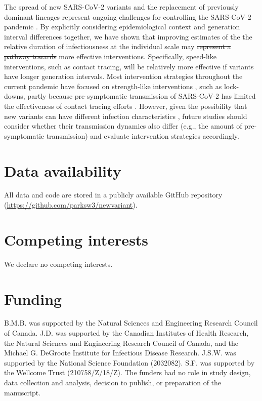 \documentclass[12pt]{article}
\providecommand{\DIFaddtex}[1]{{\protect\color{blue}\uwave{#1}}} %
\providecommand{\DIFdeltex}[1]{{\protect\color{red}\sout{#1}}}                      %
\providecommand{\DIFaddbegin}{} %
\providecommand{\DIFaddend}{} %
\providecommand{\DIFdelbegin}{} %
\providecommand{\DIFdelend}{} %
\providecommand{\DIFadd}[1]{\texorpdfstring{\DIFaddtex{#1}}{#1}} %
\providecommand{\DIFdel}[1]{\texorpdfstring{\DIFdeltex{#1}}{}} %
\newcommand{\DIFscaledelfig}{0.5}
\newlength{\DIFdelgraphicswidth} %
\newlength{\DIFdelgraphicsheight} %
\newcommand{\DIFaddincludegraphics}[2][]{{\color{blue}\fbox{\DIFOincludegraphics[#1]{#2}}}} %
\newcommand{\DIFdelincludegraphics}[2][]{%
\sbox{\DIFdelgraphicsbox}{\DIFOincludegraphics[#1]{#2}}%
\settoboxwidth{\DIFdelgraphicswidth}{\DIFdelgraphicsbox} %
\settoboxtotalheight{\DIFdelgraphicsheight}{\DIFdelgraphicsbox} %
\scalebox{\DIFscaledelfig}{%
\parbox[b]{\DIFdelgraphicswidth}{\usebox{\DIFdelgraphicsbox}\\[-\baselineskip] \rule{\DIFdelgraphicswidth}{0em}}\llap{\resizebox{\DIFdelgraphicswidth}{\DIFdelgraphicsheight}{%
\setlength{\unitlength}{\DIFdelgraphicswidth}%
\begin{picture}(1,1)%
\thicklines\linethickness{2pt} %
{\color[rgb]{1,0,0}\put(0,0){\framebox(1,1){}}}%
{\color[rgb]{1,0,0}\put(0,0){\line( 1,1){1}}}%
{\color[rgb]{1,0,0}\put(0,1){\line(1,-1){1}}}%
\end{picture}%
}\hspace*{3pt}}} %
} %
\DeclareRobustCommand{\DIFaddbegin}{\DIFOaddbegin \let\includegraphics\DIFaddincludegraphics} %
\DeclareRobustCommand{\DIFaddend}{\DIFOaddend \let\includegraphics\DIFOincludegraphics} %
\DeclareRobustCommand{\DIFdelbegin}{\DIFOdelbegin \let\includegraphics\DIFdelincludegraphics} %
\DeclareRobustCommand{\DIFdelend}{\DIFOaddend \let\includegraphics\DIFOincludegraphics} %
\begin{document}
The spread of new SARS-CoV-2 variants and the replacement of previously dominant lineages represent ongoing challenges for controlling the SARS-CoV-2 pandemic \citep{abdool2021new,fontanet2021sars,walensky2021sars}.  
By explicitly considering epidemiological context and generation interval differences together, we have shown that improving estimates of the the relative duration of infectiousness at the individual scale may \DIFdelbegin \DIFdel{represent a pathway towards }\DIFdelend \DIFaddbegin \DIFadd{help guide }\DIFaddend more effective interventions. 
Specifically, speed-like interventions, such as contact tracing, will be relatively more effective if variants have longer generation intervals.
Most intervention strategies throughout the current pandemic have focused on strength-like interventions \citep{flaxman2020Rt}, such as lock-downs, partly because pre-symptomatic transmission of SARS-CoV-2 has limited the effectiveness of contact tracing efforts \citep{hellewell2020feasibility}.
However, given the possibility that new variants can have different infection characteristics \citep{kissler2021densely}, future studies should consider whether their transmission dynamics also differ (e.g., the amount of pre-symptomatic transmission) and evaluate intervention strategies accordingly.

\section*{Data availability}

All data and code are stored in a publicly available GitHub repository (\url{https://github.com/parksw3/newvariant}).

\section*{Competing interests}

We declare no competing interests.

\section*{Funding}

B.M.B. was supported by the Natural Sciences and Engineering Research Council of Canada. 
J.D. was supported by the Canadian Institutes of Health Research, 
the Natural Sciences and Engineering Research Council of Canada, 
and the Michael G. DeGroote Institute for Infectious Disease Research.
J.S.W. was supported by the National Science Foundation (2032082).
S.F. was supported by the Wellcome Trust (210758/Z/18/Z).
The funders had no role in study design, data collection and analysis, decision to publish, or preparation of the manuscript.

\pagebreak


\end{document}
